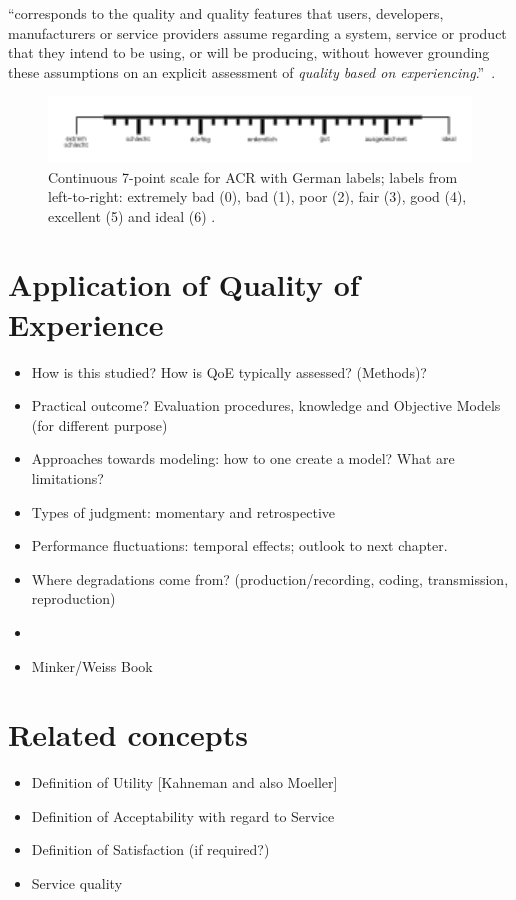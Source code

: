 \begin{definition}
``corresponds to the quality and quality features that users, developers, manufacturers or  service  providers assume regarding a  system, service or product that they intend to be using, or will be producing, without however grounding these assumptions on an explicit assessment of \textit{quality based on experiencing}.''~\citep[p. 20]{moller_quality_2014}.
\end{definition}


\begin{figure}
	\includegraphics[width=1\textwidth]{fig/quality7pt_scale}
	\caption{Continuous 7-point scale for \ac{ACR} with German labels; labels from left-to-right: extremely bad (0), bad (1), poor (2), fair (3), good (4), excellent (5) and ideal (6) \citep{itu-t_p.805:_2007}.}
	\label{img:chap02:qualityScale}
\end{figure}

\section{Application of Quality of Experience}
\begin{itemize}
\item How is this studied? How is QoE typically assessed? (Methods)? 
\item Practical outcome? Evaluation procedures, knowledge and Objective Models (for different purpose)

\item Approaches towards modeling: how to one create a model? What are limitations?
\item Types of judgment: momentary and retrospective
\item Performance fluctuations: temporal effects; outlook to next chapter.
\item Where degradations come from? (production/recording, coding, transmission, reproduction)
\item \cite{pitrey_aligning_2011}
\item Minker/Weiss Book
\end{itemize}


\section{Related concepts}
\begin{itemize}
\item Definition of Utility [Kahneman and also Moeller]
\item Definition of Acceptability with regard to Service
\item Definition of Satisfaction (if required?)
\item Service quality
\end{itemize}
